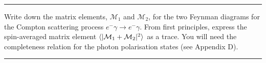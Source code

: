 \noindent\rule{7in}{1.5pt}


\begin{problem}{6.12}
Write down the matrix elements, $\mathcal{M}_1$ and $\mathcal{M}_2$, for the two Feynman diagrams for the Compton scattering process $e^-\gamma\to e^-\gamma$. From first principles, express the spin-averaged matrix element $\langle |\mathcal{M}_1+\mathcal{M}_2|^2 \rangle$ as a trace. You will need the completeness relation for the photon polarisation states (see Appendix D).
\end{problem}
\begin{solution}

\end{solution}

\noindent\rule{7in}{1.5pt}

